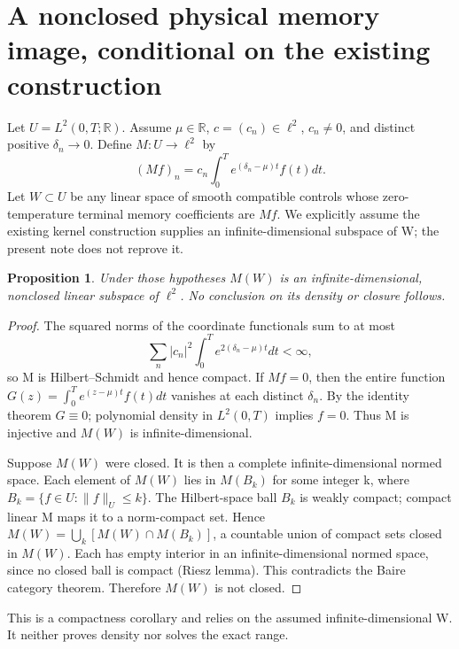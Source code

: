 \documentclass[11pt]{article}
\newtheorem{proposition}{Proposition}
\begin{document}
\section{A nonclosed physical memory image, conditional on the existing construction}
Let \(U=L^2(0,T;\mathbb R)\). Assume \(\mu\in\mathbb R\), \(c=(c_n)\in\ell^2\), \(c_n\ne0\), and distinct positive \(\delta_n\to0\). Define \(M:U\to\ell^2\) by
\[
(Mf)_n=c_n\int_0^T e^{(\delta_n-\mu)t}f(t)dt.
\]
Let \(W\subset U\) be any linear space of smooth compatible controls whose zero-temperature terminal memory coefficients are \(Mf\). We explicitly assume the existing kernel construction supplies an infinite-dimensional subspace of W; the present note does not reprove it.
\begin{proposition}\label{prop:nonclosed}
Under those hypotheses \(M(W)\) is an infinite-dimensional, nonclosed linear subspace of \(\ell^2\). No conclusion on its density or closure follows.
\end{proposition}
\begin{proof}
The squared norms of the coordinate functionals sum to at most
\[
\sum_n |c_n|^2\int_0^T e^{2(\delta_n-\mu)t}dt<\infty,
\]
so M is Hilbert--Schmidt and hence compact. If \(Mf=0\), then the entire function \(G(z)=\int_0^T e^{(z-\mu)t}f(t)dt\) vanishes at each distinct \(\delta_n\). By the identity theorem \(G\equiv0\); polynomial density in \(L^2(0,T)\) implies \(f=0\). Thus M is injective and \(M(W)\) is infinite-dimensional.

Suppose \(M(W)\) were closed. It is then a complete infinite-dimensional normed space. Each element of \(M(W)\) lies in \(M(B_k)\) for some integer k, where \(B_k=\{f\in U:\|f\|_U\le k\}\). The Hilbert-space ball \(B_k\) is weakly compact; compact linear M maps it to a norm-compact set. Hence \(M(W)=\bigcup_k[M(W)\cap M(B_k)]\), a countable union of compact sets closed in \(M(W)\). Each has empty interior in an infinite-dimensional normed space, since no closed ball is compact (Riesz lemma). This contradicts the Baire category theorem. Therefore \(M(W)\) is not closed.
\end{proof}
This is a compactness corollary and relies on the assumed infinite-dimensional W. It neither proves density nor solves the exact range.
\end{document}
